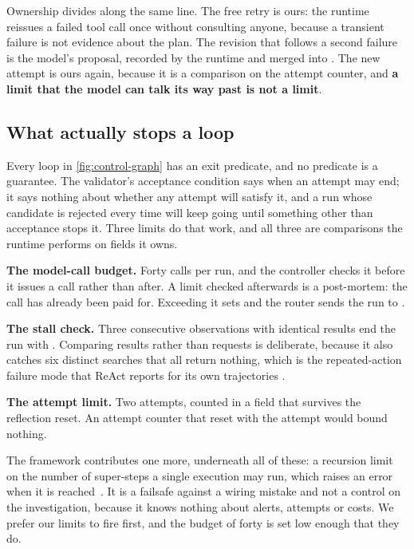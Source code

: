 Ownership divides along the same line. The free retry is ours: the runtime reissues a failed tool
call once without consulting anyone, because a transient failure is not evidence about the plan.
The revision that follows a second failure is the model's proposal, recorded by the runtime and
merged into . The new attempt is ours again, because it is a comparison on the attempt
counter, and \textbf{a limit that the model can talk its way past is not a limit}.

\subsection{What actually stops a loop}
\label{sec:control-bounds}

Every loop in \cref{fig:control-graph} has an exit predicate, and no predicate is a guarantee. The
validator's acceptance condition says when an attempt may end; it says nothing about whether any
attempt will satisfy it, and a run whose candidate is rejected every time will keep going until
something other than acceptance stops it. Three limits do that work, and all three are comparisons
the runtime performs on fields it owns.

\bi

\item \textbf{The model-call budget.} Forty calls per run, and the controller checks it before it
issues a call rather than after. A limit checked afterwards is a post-mortem: the call has already
been paid for. Exceeding it sets  and the router sends the run to
.

\item \textbf{The stall check.} Three consecutive observations with identical results end the run
with . Comparing results rather than requests is deliberate, because it also
catches six distinct searches that all return nothing, which is the repeated-action failure mode
that ReAct reports for its own trajectories \citep[\S3.3]{yao2023react}.

\item \textbf{The attempt limit.} Two attempts, counted in a field that survives the reflection
reset. An attempt counter that reset with the attempt would bound nothing.

\ei

The framework contributes one more, underneath all of these: a recursion limit on the number of
super-steps a single execution may run, which raises an error when it is
reached~\citep{langgraph-graph-api}. It is a failsafe against a wiring mistake and not a control on
the investigation, because it knows nothing about alerts, attempts or costs. We prefer our limits to
fire first, and the budget of forty is set low enough that they do.

